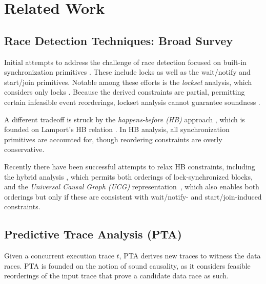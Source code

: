 \section{Related Work}


\subsection{Race Detection Techniques: Broad Survey} 

Initial attempts to address the challenge of race detection focused on 
built-in synchronization primitives \cite{eraser,SasturkarAWS05,vonPraun:2001,
Choi:2002}. These include locks as well as the wait/notify and start/join 
primitives. Notable among these efforts is the \emph{lockset} analysis, 
which considers only locks \cite{eraser}. Because the derived constraints 
are partial, permitting certain infeasible event reorderings, lockset 
analysis cannot guarantee soundness \cite{Naik:2006}. 

A different tradeoff is struck by the \emph{happens-before (HB)} 
approach \cite{Christiaens,Dinning:1990,Mellor-Crummey:1991}, which is 
founded on Lamport's HB relation \cite{Lamport}. In HB analysis, all 
synchronization primitives are accounted for, though reordering constraints 
are overly conservative. 


Recently there have been successful attempts to relax HB constraints, including
the hybrid analysis \cite{hybrid}, which permits both orderings of 
lock-synchronized blocks, and the \emph{Universal Causal Graph (UCG)} 
representation~\cite{ucg}, which also enables both orderings but only 
if these are consistent with wait/notify- and start/join-induced constraints.

\subsection{Predictive Trace Analysis (PTA)}

Given a concurrent execution trace $t$, PTA derives new traces to witness 
the data races. PTA is founded on the notion of sound causality, as it 
considers feasible reorderings of the input trace that prove a candidate 
data race as such. 

